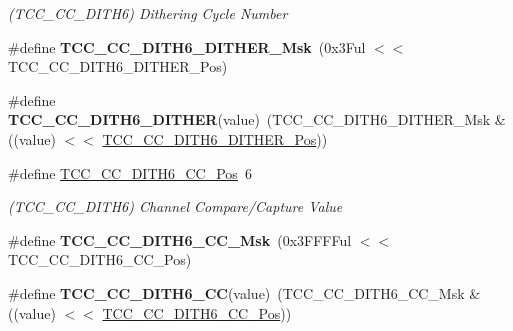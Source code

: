 \begin{DoxyCompactItemize}
\begin{DoxyCompactList}\small\item\em (T\+C\+C\+\_\+\+C\+C\+\_\+\+D\+I\+T\+H6) Dithering Cycle Number \end{DoxyCompactList}\item 
\hypertarget{group___s_a_m_l21___t_c_c_ga55cb3e60980c204ecd197c1e504b8af7}{}\#define {\bfseries T\+C\+C\+\_\+\+C\+C\+\_\+\+D\+I\+T\+H6\+\_\+\+D\+I\+T\+H\+E\+R\+\_\+\+Msk}~(0x3\+Ful $<$$<$ T\+C\+C\+\_\+\+C\+C\+\_\+\+D\+I\+T\+H6\+\_\+\+D\+I\+T\+H\+E\+R\+\_\+\+Pos)\label{group___s_a_m_l21___t_c_c_ga55cb3e60980c204ecd197c1e504b8af7}

\item 
\hypertarget{group___s_a_m_l21___t_c_c_gab6f97517ac258cc5800de1ad4ceba39f}{}\#define {\bfseries T\+C\+C\+\_\+\+C\+C\+\_\+\+D\+I\+T\+H6\+\_\+\+D\+I\+T\+H\+E\+R}(value)~(T\+C\+C\+\_\+\+C\+C\+\_\+\+D\+I\+T\+H6\+\_\+\+D\+I\+T\+H\+E\+R\+\_\+\+Msk \& ((value) $<$$<$ \hyperlink{group___s_a_m_l21___t_c_c_ga2f0c7715b5ecca42767a8cbd7cfa3075}{T\+C\+C\+\_\+\+C\+C\+\_\+\+D\+I\+T\+H6\+\_\+\+D\+I\+T\+H\+E\+R\+\_\+\+Pos}))\label{group___s_a_m_l21___t_c_c_gab6f97517ac258cc5800de1ad4ceba39f}

\item 
\hypertarget{group___s_a_m_l21___t_c_c_ga45fcd5f15c7d7c931424ea0b9f8d537b}{}\#define \hyperlink{group___s_a_m_l21___t_c_c_ga45fcd5f15c7d7c931424ea0b9f8d537b}{T\+C\+C\+\_\+\+C\+C\+\_\+\+D\+I\+T\+H6\+\_\+\+C\+C\+\_\+\+Pos}~6\label{group___s_a_m_l21___t_c_c_ga45fcd5f15c7d7c931424ea0b9f8d537b}

\begin{DoxyCompactList}\small\item\em (T\+C\+C\+\_\+\+C\+C\+\_\+\+D\+I\+T\+H6) Channel Compare/\+Capture Value \end{DoxyCompactList}\item 
\hypertarget{group___s_a_m_l21___t_c_c_gaaa41ff8cc8973bada4bebc56dbc855f1}{}\#define {\bfseries T\+C\+C\+\_\+\+C\+C\+\_\+\+D\+I\+T\+H6\+\_\+\+C\+C\+\_\+\+Msk}~(0x3\+F\+F\+F\+Ful $<$$<$ T\+C\+C\+\_\+\+C\+C\+\_\+\+D\+I\+T\+H6\+\_\+\+C\+C\+\_\+\+Pos)\label{group___s_a_m_l21___t_c_c_gaaa41ff8cc8973bada4bebc56dbc855f1}

\item 
\hypertarget{group___s_a_m_l21___t_c_c_gab78a543660a156953105e483ff5c7e77}{}\#define {\bfseries T\+C\+C\+\_\+\+C\+C\+\_\+\+D\+I\+T\+H6\+\_\+\+C\+C}(value)~(T\+C\+C\+\_\+\+C\+C\+\_\+\+D\+I\+T\+H6\+\_\+\+C\+C\+\_\+\+Msk \& ((value) $<$$<$ \hyperlink{group___s_a_m_l21___t_c_c_ga45fcd5f15c7d7c931424ea0b9f8d537b}{T\+C\+C\+\_\+\+C\+C\+\_\+\+D\+I\+T\+H6\+\_\+\+C\+C\+\_\+\+Pos}))\label{group___s_a_m_l21___t_c_c_gab78a543660a156953105e483ff5c7e77}


\end{DoxyCompactItemize}
